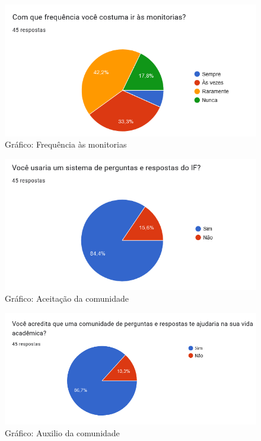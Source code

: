 \begin{figure}[htb]
\centering
\caption{Gráfico: Frequência às monitorias}
\label{Grafico frequencia monitorias}
\includegraphics[width=1.0\textwidth]{anexos/Imagens_PesquisaAceitacao/p06.png}
\end{figure}
\FloatBarrier

\begin{figure}[htb]
\centering
\caption{Gráfico: Aceitação da comunidade}
\label{Grafico aceitacao comunidade}
\includegraphics[width=1.0\textwidth]{anexos/Imagens_PesquisaAceitacao/p7.png}
\end{figure}
\FloatBarrier

\begin{figure}[htb]
\centering
\caption{Gráfico: Auxilio da comunidade}
\label{Grafico auxilio da comunidade}
\includegraphics[width=1.0\textwidth]{anexos/Imagens_PesquisaAceitacao/p08.png}
\end{figure}
\FloatBarrier

